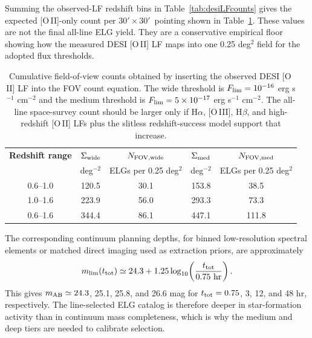 \documentclass[10pt,onecolumn]{article}
\newcommand{\fovlarge}{$30'\!\times30'$}
\begin{document}
Summing the observed-LF redshift bins in Table~\ref{tab:desiLFcounts} gives the expected [O\,II]-only count per \fovlarge\ pointing shown in Table~\ref{tab:desiFOVsum}. These values are not the final all-line ELG yield. They are a conservative empirical floor showing how the measured DESI [O\,II] LF maps into one 0.25 deg$^2$ field for the adopted flux thresholds.

\begin{table}[tp]
\centering
\sffamily\small
\begin{tabularx}{\textwidth}{@{}c c c c c@{}}
\toprule
\textbf{Redshift range} & \textbf{$\Sigma_{\rm wide}$} & \textbf{$N_{\rm FOV,wide}$} & \textbf{$\Sigma_{\rm med}$} & \textbf{$N_{\rm FOV,med}$}\\
 & deg$^{-2}$ & ELGs per 0.25 deg$^2$ & deg$^{-2}$ & ELGs per 0.25 deg$^2$\\
\midrule
0.6--1.0 & 120.5 & 30.1 & 153.8 & 38.5\\
1.0--1.6 & 223.9 & 56.0 & 293.3 & 73.3\\
0.6--1.6 & 344.4 & 86.1 & 447.1 & 111.8\\
\bottomrule
\end{tabularx}
\caption{Cumulative field-of-view counts obtained by inserting the observed DESI [O\,II] LF into the FOV count equation. The wide threshold is $F_{\rm lim}=10^{-16}$ erg s$^{-1}$ cm$^{-2}$ and the medium threshold is $F_{\rm lim}=5\times10^{-17}$ erg s$^{-1}$ cm$^{-2}$. The all-line space-survey count should be larger only if H$\alpha$, [O\,III], H$\beta$, and high-redshift [O\,II] LFs plus the slitless redshift-success model support that increase.}
\label{tab:desiFOVsum}
\end{table}

The corresponding continuum planning depths, for binned low-resolution spectral elements or matched direct imaging used as extraction priors, are approximately
\begin{equation}
  m_{\rm lim}(t_{\rm tot})\simeq24.3+
  1.25\log_{10}\!\left(\frac{t_{\rm tot}}{0.75\ {\rm hr}}\right).
\end{equation}
This gives $m_{\rm AB}\simeq24.3$, 25.1, 25.8, and 26.6 mag for $t_{\rm tot}=0.75$, 3, 12, and 48 hr, respectively. The line-selected ELG catalog is therefore deeper in star-formation activity than in continuum mass completeness, which is why the medium and deep tiers are needed to calibrate selection.
\end{document}

